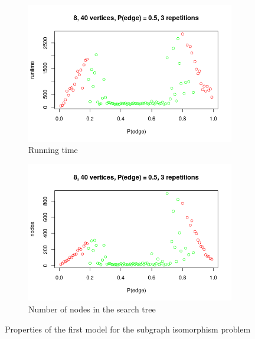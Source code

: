 \documentclass{article}
\theoremstyle{definition}
\begin{document}
\begin{figure}
  \begin{subfigure}{.5\textwidth}
    \includegraphics[scale=0.5]{subgraph_runtime.png}
    \caption{Running time}
  \end{subfigure}
  \begin{subfigure}{.5\textwidth}
    \includegraphics[scale=0.5]{subgraph_nodes.png}
    \caption{Number of nodes in the search tree}
  \end{subfigure}
  \caption{Properties of the first model for the subgraph isomorphism problem}
  \label{fig:subgraph_properties}
\end{figure}
\end{document}

